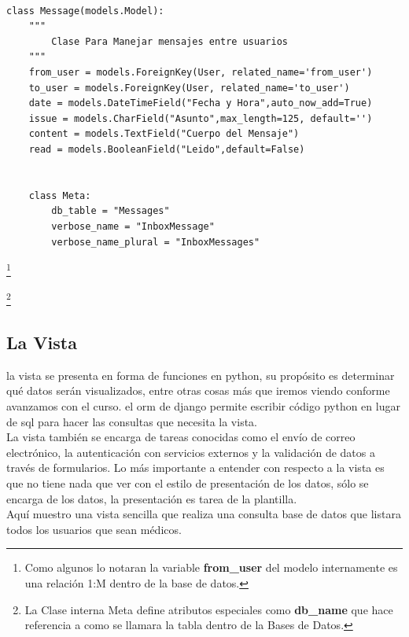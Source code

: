 \begin{lstlisting}[style=Python]

class Message(models.Model):
    """
        Clase Para Manejar mensajes entre usuarios
    """
    from_user = models.ForeignKey(User, related_name='from_user')
    to_user = models.ForeignKey(User, related_name='to_user')
    date = models.DateTimeField("Fecha y Hora",auto_now_add=True)
    issue = models.CharField("Asunto",max_length=125, default='')
    content = models.TextField("Cuerpo del Mensaje")
    read = models.BooleanField("Leido",default=False)


    class Meta:
        db_table = "Messages"
        verbose_name = "InboxMessage"
        verbose_name_plural = "InboxMessages"
\end{lstlisting}

\footnote{Como algunos lo notaran la variable \textbf{from\_user} del modelo internamente es una relación 1:M dentro de la base de datos.}

\footnote{La Clase interna Meta define atributos especiales como \textbf{db\_name} que hace referencia a como se llamara la tabla dentro de la Bases de Datos.}

\vspace{0.1cm}

\subsection{La Vista}
la vista se presenta en forma de funciones en python, su propósito es determinar qué datos serán visualizados, entre otras cosas más que iremos viendo conforme avanzamos con el curso. el orm de django permite escribir código python en lugar de sql para hacer las consultas que necesita la vista. \\[0.1cm]

La vista también se encarga de tareas conocidas como el enví­o de correo electrónico, la autenticación con servicios externos y la validación de datos a través de formularios. Lo más importante a entender con respecto  a la  vista es que no tiene nada que ver con el estilo de presentación de los  datos, sólo se encarga de los datos, la presentación es tarea de la plantilla.\\[0.1cm]


Aquí muestro una vista sencilla que realiza una consulta base de datos que listara todos los usuarios que sean médicos. \\[0.1cm]

